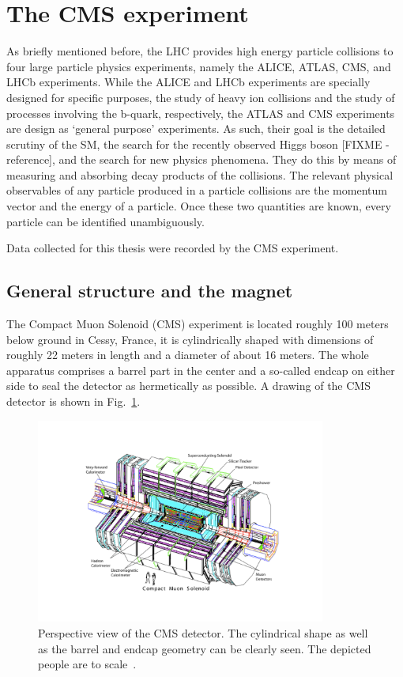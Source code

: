 \section{The CMS experiment}
\label{sec:cms}
As briefly mentioned before, the LHC provides high energy particle collisions to four large particle physics experiments, namely
the ALICE, ATLAS, CMS, and LHCb experiments. While the ALICE and LHCb experiments are specially designed for specific purposes,
the study of heavy ion collisions and the study of processes involving the b-quark, respectively, the ATLAS and CMS experiments
are design as `general purpose' experiments. As such, their goal is the detailed scrutiny of the SM, the search for the recently observed
Higgs boson [FIXME - reference], and the search for new physics phenomena. They do this by means of measuring and absorbing decay products
of the collisions. The relevant physical observables of any particle produced in a particle collisions are the momentum vector
and the energy of a particle. Once these two quantities are known, every particle can be identified unambiguously. 

Data collected for this thesis were recorded by the CMS experiment.

\subsection{General structure and the magnet}
\label{sub:cms_general}
The Compact Muon Solenoid (CMS) experiment is located roughly 100 meters below ground in Cessy, France,
it is cylindrically shaped with dimensions of roughly 22 meters in length and a diameter of about 16 meters. 
The whole apparatus comprises a barrel part in the center and a so-called endcap on either side to seal the detector as hermetically as possible.
A drawing of the CMS detector is shown in Fig.~\ref{fig:cms_scheme}. 

\begin{figure}[h!]
    \centering
    \includegraphics[width=0.85\textwidth]{../figs/cms_scheme.pdf}
    \caption{Perspective view of the CMS detector. The cylindrical shape as well as the barrel and endcap
geometry can be clearly seen. The depicted people are to scale~\cite{cmsdetector}.}
    \label{fig:cms_scheme}
\end{figure}

